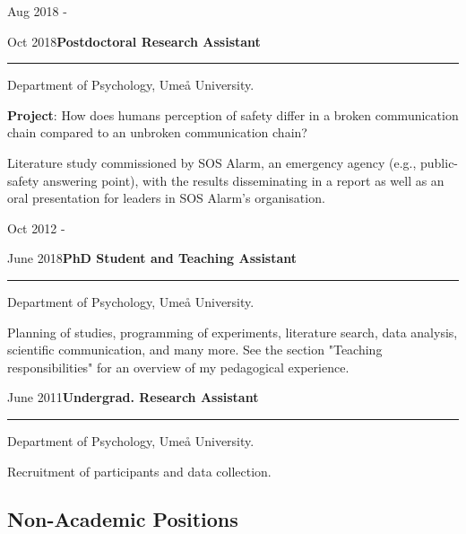 \documentclass[]{article}
\begin{document}
Aug 2018 -

Oct
2018\hspace{0.75cm}\textbf{Postdoctoral Research Assistant}\vspace{1mm}

\hrule
\begin{changemargin}{2.3cm}{2.4cm}

Department of Psychology, Umeå University.

\textbf{Project}: How does humans perception of safety differ in a broken communication chain compared to an unbroken communication chain? 

Literature study commissioned by SOS Alarm, an emergency agency (e.g., public-safety answering point), with the results disseminating in a report as well as an oral presentation for leaders in SOS Alarm's organisation.

\end{changemargin}

Oct 2012 -

June
2018\hspace{0.75cm}\textbf{PhD Student and Teaching Assistant}\vspace{1mm}

\hrule
\begin{changemargin}{2.3cm}{2.4cm}

Department of Psychology, Umeå University.

Planning of studies, programming of experiments, literature search, data analysis, scientific communication, and many more. See the section "Teaching responsibilities" for an overview of my pedagogical experience.

\end{changemargin}

June
2011\hspace{0.75cm}\textbf{Undergrad. Research Assistant}\vspace{1mm}

\hrule
\begin{changemargin}{2.3cm}{2.4cm}

Department of Psychology, Umeå University.

Recruitment of participants and data collection.

\end{changemargin}

\hypertarget{non-academic-positions}{%
\subsection{Non-Academic Positions}\label{non-academic-positions}}
\end{document}
